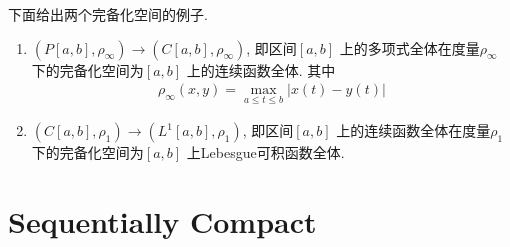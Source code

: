 \begin{thm}
		\vspace{1em}
		
		\begin{example}\label{ex 1.2.4}
			下面给出两个完备化空间的例子.
			\begin{enumerate}
				\item  $(P[a , b] , \rho_\infty) \rightarrow (C[a , b] , \rho_\infty)$, 即区间$[a , b]$ 上的多项式全体在度量$\rho_\infty$ 下的完备化空间为$[a , b]$ 上的连续函数全体. 其中
				\begin{align}
					\rho_\infty(x , y) = \max_{a \leq t \leq b}{\left| x(t) - y(t) \right|}
				\end{align}
				
				\item $(C[a , b] , \rho_1) \rightarrow (L^1[a , b] , \rho_1)$, 即区间$[a , b]$ 上的连续函数全体在度量$\rho_1$ 下的完备化空间为$[a , b]$ 上Lebesgue可积函数全体.
			\end{enumerate}
		\end{example}
	\end{thm}

\newpage

\section{Sequentially Compact}
